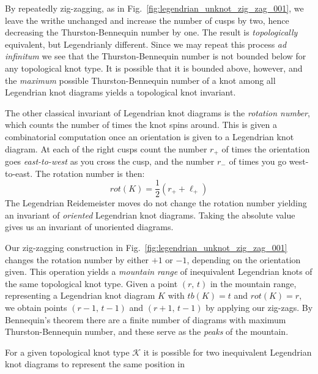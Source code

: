     By repeatedly zig-zagging, as in
    Fig.~\ref{fig:legendrian_unknot_zig_zag_001}, we leave the writhe unchanged
    and increase the number of cusps by two, hence decreasing the
    Thurston-Bennequin number by one. The result is \textit{topologically}
    equivalent, but Legendrianly different. Since we may repeat this process
    \textit{ad infinitum} we see that the Thurston-Bennequin number is not
    bounded below for any topological knot type. It is possible that it is
    bounded above, however, and the \textit{maximum} possible
    Thurston-Bennequin number of a knot among all Legendrian knot diagrams
    yields a topological knot invariant.
    \par\hfill\par
    The other classical invariant of Legendrian knot diagrams is the
    \textit{rotation number}, which counts the number of times the knot spins
    around. This is given a combinatorial computation once an orientation is
    given to a Legendrian knot diagram. At each of the right cusps count the
    number $r_{+}$ of times the orientation goes \textit{east-to-west} as you
    cross the cusp, and the number $r_{-}$ of times you go west-to-east.
    The rotation number is then:
    \begin{equation}
        rot(K)=\frac{1}{2}(r_{+}+\ell_{+})
    \end{equation}
    The Legendrian Reidemeister moves do not change the rotation number yielding
    an invariant of \textit{oriented} Legendrian knot diagrams. Taking the
    absolute value gives us an invariant of unoriented diagrams.
    \par\hfill\par
    Our zig-zagging construction in Fig.~\ref{fig:legendrian_unknot_zig_zag_001}
    changes the rotation number by either $+1$ or $-1$, depending on the
    orientation given. This operation yields a \textit{mountain range} of
    inequivalent Legendrian knots of the same topological knot type. Given
    a point $(r,\,t)$ in the mountain range, representing a Legendrian knot
    diagram $K$ with $tb(K)=t$ and $rot(K)=r$, we obtain points
    $(r-1,\,t-1)$ and $(r+1,\,t-1)$ by applying our zig-zags. By
    Bennequin's theorem there are a finite number of diagrams with
    maximum Thurston-Bennequin number, and these serve as the
    \textit{peaks} of the mountain.
    \par\hfill\par
    For a given topological knot type $\mathcal{K}$ it is possible for two
    inequivalent Legendrian knot diagrams to represent the same position in
